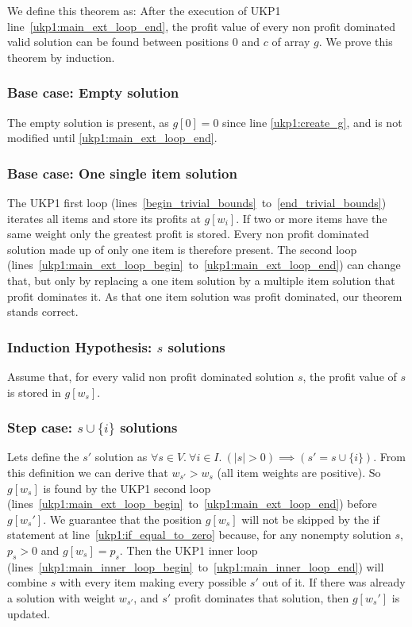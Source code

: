 \documentclass[12pt]{article}
\begin{document}
We define this theorem as: After the execution of UKP1 line~\ref{ukp1:main_ext_loop_end}, the profit value of every non profit dominated valid solution can be found between positions \(0\) and \(c\) of array \(g\). We prove this theorem by induction.

\subsubsection{Base case: Empty solution}

The empty solution is present, as \(g[0] = 0\) since line \ref{ukp1:create_g}, and is not modified until \ref{ukp1:main_ext_loop_end}.

\subsubsection{Base case: One single item solution}

The UKP1 first loop (lines~\ref{begin_trivial_bounds}~to~\ref{end_trivial_bounds}) iterates all items and store its profits at \(g[w_i]\). If two or more items have the same weight only the greatest profit is stored. Every non profit dominated solution made up of only one item is therefore present. The second loop (lines~\ref{ukp1:main_ext_loop_begin}~to~\ref{ukp1:main_ext_loop_end}) can change that, but only by replacing a one item solution by a multiple item solution that profit dominates it. As that one item solution was profit dominated, our theorem stands correct.

\subsubsection{Induction Hypothesis: \(s\) solutions}

Assume that, for every valid non profit dominated solution \(s\), the profit value of \(s\) is stored in \(g[w_s]\).

\subsubsection{Step case: \(s \cup \{i\}\) solutions}

Lets define the \(s'\) solution as \(\forall s \in V.~\forall i \in I.~(|s| > 0) \implies (s' = s \cup \{i\})\). From this definition we can derive that \(w_{s'} > w_s\) (all item weights are positive). So \(g[w_s]\) is found by the UKP1 second loop (lines~\ref{ukp1:main_ext_loop_begin}~to~\ref{ukp1:main_ext_loop_end}) before \(g[w_s']\). We guarantee that the position \(g[w_s]\) will not be skipped by the if statement at line~\ref{ukp1:if_equal_to_zero} because, for any nonempty solution \(s\), \(p_s > 0\) and \(g[w_s] = p_s\). Then the UKP1 inner loop (lines~\ref{ukp1:main_inner_loop_begin}~to~\ref{ukp1:main_inner_loop_end}) will combine \(s\) with every item making every possible \(s'\) out of it. If there was already a solution with weight \(w_{s'}\), and \(s'\) profit dominates that solution, then \(g[w_s']\) is updated.
\end{document}
